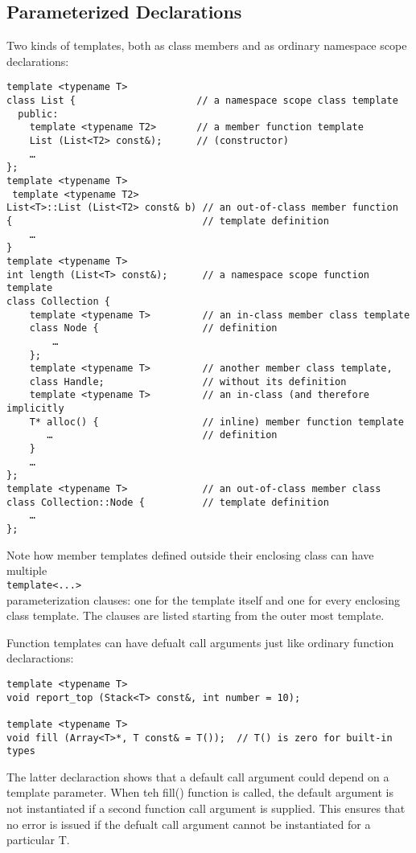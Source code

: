 \documentclass[a4paper,12pt]{book}
\begin{document}
\subsection{Parameterized Declarations}
Two kinds of templates, both as class members and as ordinary namespace scope declarations:
\begin{verbatim}
template <typename T> 
class List {                     // a namespace scope class template 
  public: 
    template <typename T2>       // a member function template 
    List (List<T2> const&);      // (constructor) 
    … 
}; 
template <typename T> 
 template <typename T2> 
List<T>::List (List<T2> const& b) // an out-of-class member function 
{                                 // template definition 
    … 
} 
template <typename T> 
int length (List<T> const&);      // a namespace scope function template 
class Collection { 
    template <typename T>         // an in-class member class template 
    class Node {                  // definition 
        … 
    }; 
    template <typename T>         // another member class template, 
    class Handle;                 // without its definition 
    template <typename T>         // an in-class (and therefore implicitly 
    T* alloc() {                  // inline) member function template 
       …                          // definition 
    } 
    … 
}; 
template <typename T>             // an out-of-class member class 
class Collection::Node {          // template definition 
    … 
}; 
\end{verbatim}

Note how member templates defined outside their enclosing class can have multiple \\\verb|template<...>|\\ parameterization clauses: one for the template itself and one for every enclosing class template. The clauses are listed starting from the outer most template.

Function templates can have defualt call arguments just like ordinary function declaractions:
\begin{verbatim}
template <typename T> 
void report_top (Stack<T> const&, int number = 10); 

template <typename T> 
void fill (Array<T>*, T const& = T());  // T() is zero for built-in types 
\end{verbatim}

The latter declaraction shows that a default call argument could depend on a template parameter. When teh fill() function is called, the default argument is not instantiated if a second function call argument is supplied. This ensures that no error is issued if the defualt call argument cannot be instantiated for a particular T.
\end{document}
